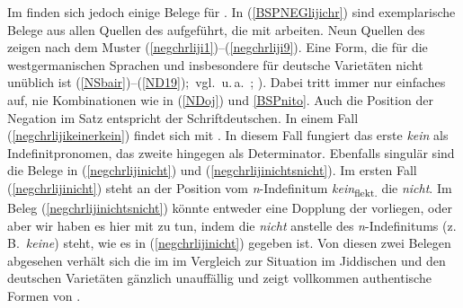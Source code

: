 Im \hai{{\LiJi}} finden sich jedoch einige Belege für . In (\ref{BSPNEGlijichr}) sind exemplarische Belege aus allen Quellen des  aufgeführt, die mit  arbeiten. Neun Quellen des  zeigen  nach dem Muster  (\ref{negchrliji1})–(\ref{negchrliji9}). Eine Form, die für die westgermanischen Sprachen und insbesondere für deutsche Varietäten nicht unüblich ist (\ref{NSbair})–(\ref{ND19});\, vgl.\, u.\,a.\, \citealt{AuweraGybels2014,Jaeger2013,Jaeger2008,Breitbarth2013}; \citealt[167–230]{Weiss1998,Swart2010,BiberauerZeijlstra2012,HaegemanZanuttini1996,Wouden1992,Besten1986}).  Dabei tritt immer nur einfaches  auf, nie Kombinationen wie in (\ref{NDoj}) und \ref{BSPnito}. Auch die Position der Negation im Satz entspricht der Schriftdeutschen. In einem Fall (\ref{negchrlijikeinerkein}) findet sich  mit . In diesem Fall fungiert das erste \textit{kein} als Indefinitpronomen, das zweite hingegen als Determinator. Ebenfalls singulär sind die Belege in (\ref{negchrlijinicht}) und (\ref{negchrlijinichtsnicht}). Im ersten Fall (\ref{negchrlijinicht}) steht an der Position vom \textit{n}-Indefinitum \textit{kein}\textsubscript{flekt.} die  \textit{nicht}. Im Beleg (\ref{negchrlijinichtsnicht}) könnte entweder eine Dopplung der  vorliegen, oder aber wir haben es hier mit  zu tun, indem die  \textit{nicht} anstelle des \textit{n}-Indefinitums (z.\,B.\, \textit{keine}) steht, wie es in (\ref{negchrlijinicht}) gegeben ist. Von diesen zwei Belegen abgesehen verhält sich die  im \hai{{\LiJi}} im Vergleich zur Situation im Jiddischen und den deutschen Varietäten gänzlich unauffällig und zeigt vollkommen authentische Formen von .  
 
